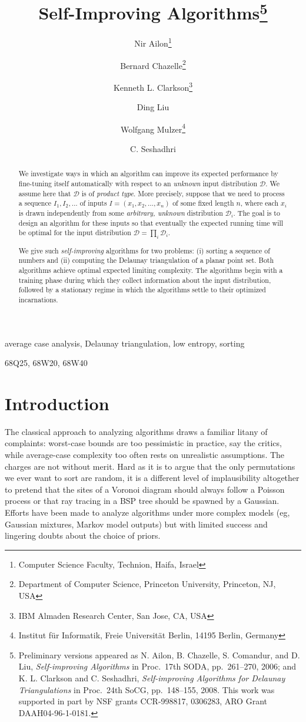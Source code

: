 \documentclass{siamltex}
\title{Self-Improving 
Algorithms\thanks{Preliminary versions appeared as
N. Ailon, B. Chazelle, S. Comandur, and D. Liu,
\emph{Self-improving Algorithms} in Proc.~17th SODA, pp.~261--270, 2006;
and K. L. Clarkson and C. Seshadhri, \emph{Self-improving Algorithms for
Delaunay Triangulations} in Proc.~24th SoCG, pp.~148--155, 2008.
This work was supported
in part by NSF grants CCR-998817, 0306283, 
ARO Grant DAAH04-96-1-0181.}}
\author{
  {Nir Ailon}\thanks{Computer Science Faculty, Technion, Haifa, Israel} 
\and
  {Bernard Chazelle}\thanks{Department of Computer Science,
       Princeton University, Princeton, NJ, USA}
\and
  {Kenneth L. Clarkson}\thanks{IBM Almaden Research Center, San Jose, CA, USA}
\and
  {Ding Liu}\footnotemark[3]
\and
  {Wolfgang Mulzer}\thanks{Institut f\"ur Informatik,
     Freie Universit\"at Berlin, 14195 Berlin, Germany}
\and
  {C. Seshadhri}\footnotemark[4]
}
\newcommand{\D}{\mathcal{D}}
\begin{document}
\maketitle

\begin{abstract}
We investigate ways in which an algorithm can improve
its expected performance by fine-tuning itself
automatically with respect to an \emph{unknown} input 
distribution $\D$.
We assume here that $\D$ is of \emph{product type}.
More precisely, suppose that we need to process a sequence
$I_1, I_2, \ldots$ of inputs $I = (x_1, x_2, \ldots, x_n)$ of
some fixed length $n$, where each $x_i$ is drawn independently from some
\emph{arbitrary, unknown} distribution $\D_i$. The goal is to
design an algorithm for these inputs so that eventually
the expected running time will be optimal for the 
input distribution $\D = \prod_i \D_i$.

We give such \emph{self-improving} algorithms  
for two problems: (i) sorting a sequence of numbers and (ii) computing 
the Delaunay triangulation of a planar point set. 
Both algorithms achieve optimal expected limiting complexity.
The algorithms begin with a training phase
during which they collect information about the input distribution,
followed by a stationary regime in which the algorithms settle to their
optimized incarnations. 
\end{abstract}

\begin{keywords}
average case analysis, Delaunay triangulation, low entropy, sorting
\end{keywords}

\begin{AMS}
68Q25, 68W20, 68W40
\end{AMS}

\pagestyle{myheadings}
\thispagestyle{plain}

\section{Introduction}\label{sec:introduction}

The classical approach to analyzing algorithms 
draws a familiar litany of complaints:
worst-case bounds are too pessimistic
in practice, say the critics, while
average-case complexity too often rests on unrealistic assumptions.
The charges are not without merit.
Hard as it is to argue that the only permutations we ever
want to sort are random, it is a different level of implausibility
altogether to pretend that the sites of a Voronoi diagram 
should always follow a Poisson
process or that ray tracing in a BSP tree should be spawned by
a Gaussian. Efforts have been made 
to analyze algorithms under more complex models
(eg, Gaussian mixtures, Markov model outputs) but 
with limited success and lingering doubts about 
the choice of priors.
\end{document}
